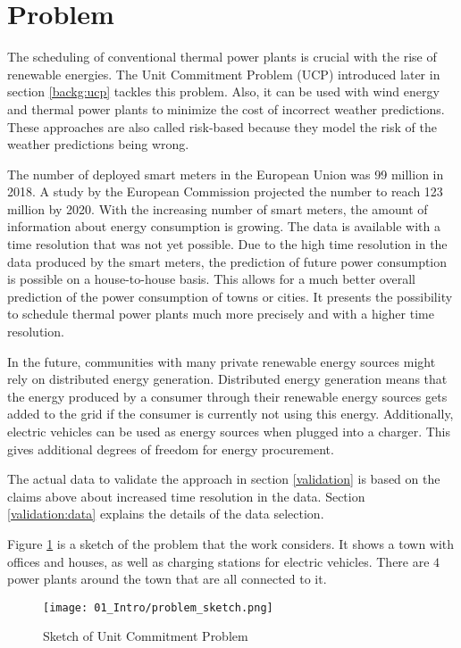 \section{Problem}

The scheduling of conventional thermal power plants is crucial with the rise of renewable energies.
The Unit Commitment Problem (UCP) introduced later in section \ref{backg:ucp} tackles this problem.
\cite{Banos2011}
Also, it can be used with wind energy and thermal power plants to minimize the cost of incorrect weather predictions.
These approaches are also called risk-based because they model the risk of the weather predictions being wrong.
\cite{Chen2008,Abujarad2017}

The number of deployed smart meters in the European Union was 99 million in 2018.
A study by the European Commission projected the number to reach 123 million by 2020.
\cite{Vlachogiannis2019}
With the increasing number of smart meters, the amount of information about energy consumption is growing.
The data is available with a time resolution that was not yet possible.
Due to the high time resolution in the data produced by the smart meters,
the prediction of future power consumption is possible on a house-to-house basis.
This allows for a much better overall prediction of the power consumption of towns or cities.
\cite{Aiello2016, Basu2013}
It presents the possibility to schedule thermal power plants much more precisely
and with a higher time resolution.

In the future, communities with many private renewable energy sources might rely on distributed energy generation.
Distributed energy generation means that the energy produced by a consumer through their renewable energy sources gets added to the grid if the consumer is currently not using this energy.
Additionally, electric vehicles can be used as energy sources when plugged into a charger.
This gives additional degrees of freedom for energy procurement.
\cite{Aiello2016, Zhang2016}

The actual data to validate the approach in section \ref{validation} is based on the claims above about increased time resolution in the data.
Section \ref{validation:data} explains the details of the data selection.

Figure \ref{figure:problem.sketch} is a sketch of the problem that the work considers.
It shows a town with offices and houses, as well as charging stations for electric vehicles.
There are $4$ power plants around the town that are all connected to it.

\begin{figure}
  \centering
  \texttt{[image: 01\_Intro/problem\_sketch.png]}
  \caption{Sketch of Unit Commitment Problem}
  \label{figure:problem.sketch}
\end{figure}
